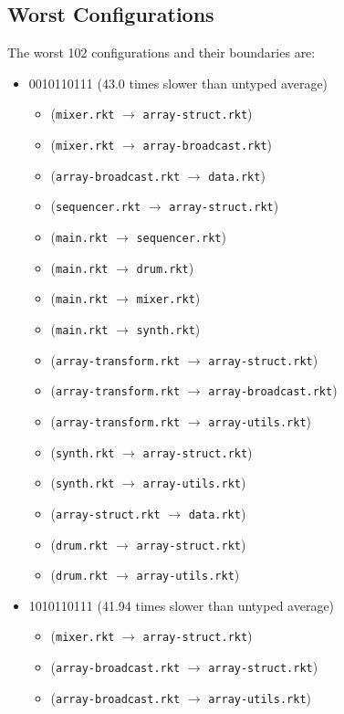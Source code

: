 \documentclass{article}
\newcommand{\mono}[1]{\texttt{#1}}
\begin{document}
\subsection{Worst Configurations}
The worst 102 configurations and their boundaries are:
\begin{itemize}
\item 0010110111 (43.0 times slower than untyped average)
  \begin{itemize}
  \item (\mono{mixer.rkt} $\rightarrow$ \mono{array-struct.rkt})
  \item (\mono{mixer.rkt} $\rightarrow$ \mono{array-broadcast.rkt})
  \item (\mono{array-broadcast.rkt} $\rightarrow$ \mono{data.rkt})
  \item (\mono{sequencer.rkt} $\rightarrow$ \mono{array-struct.rkt})
  \item (\mono{main.rkt} $\rightarrow$ \mono{sequencer.rkt})
  \item (\mono{main.rkt} $\rightarrow$ \mono{drum.rkt})
  \item (\mono{main.rkt} $\rightarrow$ \mono{mixer.rkt})
  \item (\mono{main.rkt} $\rightarrow$ \mono{synth.rkt})
  \item (\mono{array-transform.rkt} $\rightarrow$ \mono{array-struct.rkt})
  \item (\mono{array-transform.rkt} $\rightarrow$ \mono{array-broadcast.rkt})
  \item (\mono{array-transform.rkt} $\rightarrow$ \mono{array-utils.rkt})
  \item (\mono{synth.rkt} $\rightarrow$ \mono{array-struct.rkt})
  \item (\mono{synth.rkt} $\rightarrow$ \mono{array-utils.rkt})
  \item (\mono{array-struct.rkt} $\rightarrow$ \mono{data.rkt})
  \item (\mono{drum.rkt} $\rightarrow$ \mono{array-struct.rkt})
  \item (\mono{drum.rkt} $\rightarrow$ \mono{array-utils.rkt})
  \end{itemize}
\item 1010110111 (41.94 times slower than untyped average)
  \begin{itemize}
  \item (\mono{mixer.rkt} $\rightarrow$ \mono{array-struct.rkt})
  \item (\mono{array-broadcast.rkt} $\rightarrow$ \mono{array-struct.rkt})
  \item (\mono{array-broadcast.rkt} $\rightarrow$ \mono{array-utils.rkt})

\end{itemize}
\end{itemize}
\end{document}
